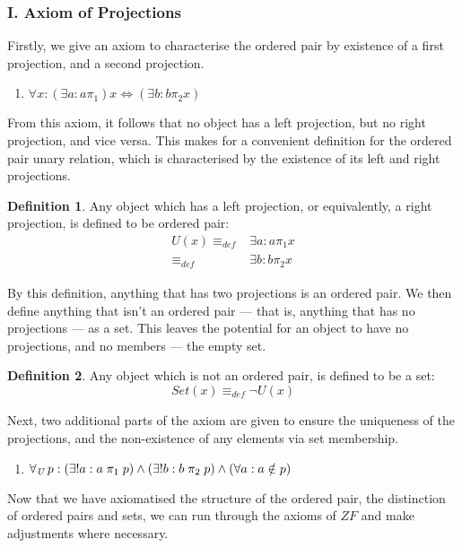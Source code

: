 \documentclass[11pt]{report}
\newcommand{\all}[1]{\forall_{\mathit{#1}}\hspace{0.5mm}}
\newcommand{\eqdef}{\equiv_\mathit{def}}
\newcommand{\pleft}{\mathrel{\pi_1}}
\newcommand{\pright}{\mathrel{\pi_2}}
\theoremstyle{definition}
\theoremstyle{theorem}
\theoremstyle{lemma}
\newtheorem{definition}{Definition}[section]
\begin{document}
\subsubsection*{I. Axiom of Projections}
Firstly, we give an axiom to characterise the ordered pair by existence of a first projection, and a second projection.
\begin{enumerate}[label=(\roman*)]
\item $\forall x: (\exists a: a\pleft) x \Leftrightarrow (\exists b: b\pright x)$
\end{enumerate}
From this axiom, it follows that no object has a left projection, but no right projection, and vice versa.
This makes for a convenient definition for the ordered pair unary relation, which is characterised by the existence of its left and right projections.

\begin{definition} Any object which has a left projection, or equivalently, a right projection, is defined to be ordered pair:
\begin{align*}
  U(x) \eqdef &\exists a: a\pleft x \\
       \eqdef &\exists b: b\pright x
\end{align*}
\end{definition}
\noindent
By this definition, anything that has two projections is an ordered pair. We then define anything that isn't an ordered pair --- that is, anything that has no projections --- as a set.
This leaves the potential for an object to have no projections, and no members --- the empty set.
\begin{definition} Any object which is not an ordered pair, is defined to be a set:
$$\mathit{Set}(x) \eqdef \neg\mathit{U}(x)$$
\end{definition}
\noindent
Next, two additional parts of the axiom are given to ensure the uniqueness of the projections, and the non-existence of any elements via set membership.
\begin{enumerate}[resume, label=(\roman*)]
  \item $\all{U} p: (\exists!a: a\pleft p) \wedge (\exists!b: b\pright p) \wedge (\forall a: a\notin p)$
\end{enumerate}
Now that we have axiomatised the structure of the ordered pair, the distinction of ordered pairs and sets, we can run through the axioms of $\mathit{ZF}$ and make adjustments where necessary.
\end{document}
